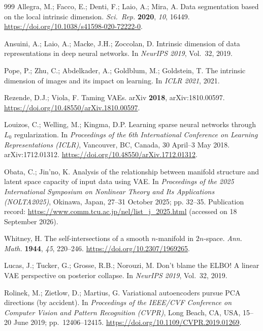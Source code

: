 \documentclass[make,article,submit,pdftex,moreauthors]{Definitions/mdpi}
\begin{document}
\begin{thebibliography}{999}
Allegra, M.; Facco, E.; Denti, F.; Laio, A.; Mira, A.
Data segmentation based on the local intrinsic dimension.
\textit{Sci.\ Rep.} \textbf{2020}, \textit{10}, 16449.
\url{https://doi.org/10.1038/s41598-020-72222-0}.

Ansuini, A.; Laio, A.; Macke, J.H.; Zoccolan, D.
Intrinsic dimension of data representations in deep neural networks.
In \textit{NeurIPS 2019}, Vol.~32, 2019.

Pope, P.; Zhu, C.; Abdelkader, A.; Goldblum, M.; Goldstein, T.
The intrinsic dimension of images and its impact on learning.
In \textit{ICLR 2021}, 2021.

Rezende, D.J.; Viola, F.
Taming VAEs.
arXiv \textbf{2018}, arXiv:1810.00597.
\url{https://doi.org/10.48550/arXiv.1810.00597}.

Louizos, C.; Welling, M.; Kingma, D.P.
Learning sparse neural networks through $L_0$ regularization.
In \textit{Proceedings of the 6th International Conference on Learning
Representations (ICLR)}, Vancouver, BC, Canada, 30 April--3 May 2018.
arXiv:1712.01312. \url{https://doi.org/10.48550/arXiv.1712.01312}.

Obata, C.; Jin'no, K.
Analysis of the relationship between manifold structure and latent space
capacity of input data using VAE.
In \textit{Proceedings of the 2025 International Symposium on Nonlinear
Theory and Its Applications (NOLTA2025)}, Okinawa, Japan, 27--31 October
2025; pp. 32--35.
Publication record: \url{https://www.comm.tcu.ac.jp/nel/list_j_2025.html}
(accessed on 18 September 2026).

Whitney, H.
The self-intersections of a smooth $n$-manifold in $2n$-space.
\textit{Ann. Math.} \textbf{1944}, \textit{45}, 220--246.
\url{https://doi.org/10.2307/1969265}.

Lucas, J.; Tucker, G.; Grosse, R.B.; Norouzi, M.
Don't blame the ELBO! A linear VAE perspective on posterior collapse.
In \textit{NeurIPS 2019}, Vol.~32, 2019.

Rolinek, M.; Zietlow, D.; Martius, G.
Variational autoencoders pursue PCA directions (by accident).
In \textit{Proceedings of the IEEE/CVF Conference on Computer Vision and
Pattern Recognition (CVPR)}, Long Beach, CA, USA, 15--20 June 2019;
pp.\ 12406--12415. \url{https://doi.org/10.1109/CVPR.2019.01269}.


\end{thebibliography}
\end{document}
